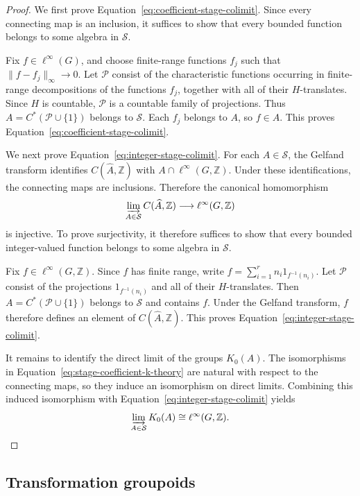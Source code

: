 \documentclass[pdflatex,sn-mathphys-num]{sn-jnl}%
\theoremstyle{plain}
\theoremstyle{remark}
\theoremstyle{definition}
\numberwithin{equation}{section}
\begin{document}
\begin{proof}
We first prove Equation~\eqref{eq:coefficient-stage-colimit}. Since every connecting map is an inclusion, it suffices to show that every bounded function belongs to some algebra in \( \mathcal S \).

Fix \( f\in\ell^\infty(G) \), and choose finite-range functions \( f_j \) such that \( \|f-f_j\|_\infty\to0 \). Let \( \mathcal P \) consist of the characteristic functions occurring in finite-range decompositions of the functions \( f_j \), together with all of their \( H \)-translates. Since \( H \) is countable, \( \mathcal P \) is a countable family of projections. Thus \( A=C^*(\mathcal P\cup\{1\}) \) belongs to \( \mathcal S \). Each \( f_j \) belongs to \( A \), so \( f\in A \). This proves Equation~\eqref{eq:coefficient-stage-colimit}.

We next prove Equation~\eqref{eq:integer-stage-colimit}. For each \( A\in\mathcal S \), the Gelfand transform identifies \( C(\widehat{A},\mathbb Z) \) with \( A\cap\ell^\infty(G,\mathbb Z) \). Under these identifications, the connecting maps are inclusions. Therefore the canonical homomorphism
\[
\varinjlim_{A\in\mathcal S}C(\widehat{A},\mathbb Z)
\longrightarrow
\ell^\infty(G,\mathbb Z)
\]
is injective. To prove surjectivity, it therefore suffices to show that every bounded integer-valued function belongs to some algebra in \( \mathcal S \).

Fix \( f\in\ell^\infty(G,\mathbb Z) \). Since \( f \) has finite range, write \( f=\sum_{i=1}^r n_i1_{f^{-1}(n_i)} \). Let \( \mathcal P \) consist of the projections \( 1_{f^{-1}(n_i)} \) and all of their \( H \)-translates. Then \( A=C^*(\mathcal P\cup\{1\}) \) belongs to \( \mathcal S \) and contains \( f \). Under the Gelfand transform, \( f \) therefore defines an element of \( C(\widehat A,\mathbb Z) \). This proves Equation~\eqref{eq:integer-stage-colimit}.

It remains to identify the direct limit of the groups \( K_0(A) \). The isomorphisms in Equation~\eqref{eq:stage-coefficient-k-theory} are natural with respect to the connecting maps, so they induce an isomorphism on direct limits. Combining this induced isomorphism with Equation~\eqref{eq:integer-stage-colimit} yields
\[
\varinjlim_{A\in\mathcal S}K_0(A)
\cong
\ell^\infty(G,\mathbb Z).
\]
\end{proof}

\subsection{Transformation groupoids}
\end{document}
